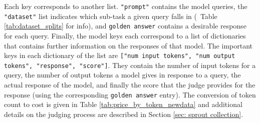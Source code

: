 Each key corresponds to another list. \texttt{"prompt"} contains the model queries, the \texttt{"dataset"} list indicates which sub-task a given query falls in (\cf\ Table \ref{tab:dataset_splits} for info), and \texttt{golden answer} contains a desirable response for each query. Finally, the model keys each correspond to a list of dictionaries that contains further information on the responses of that model. The important keys in each dictionary of the list are \texttt{["num input tokens", "num output tokens", "response", "score"]}. They contain the number of input tokens for a query, the number of output tokens a model gives in response to a query, the actual response of the model, and finally the score that the judge provides for the response (using the corresponding \texttt{golden answer} entry). The conversion of token count to cost is given in Table \ref{tab:price_by_token_newdata} and additional details on the judging process are described in Section \ref{sec: sprout collection}.

